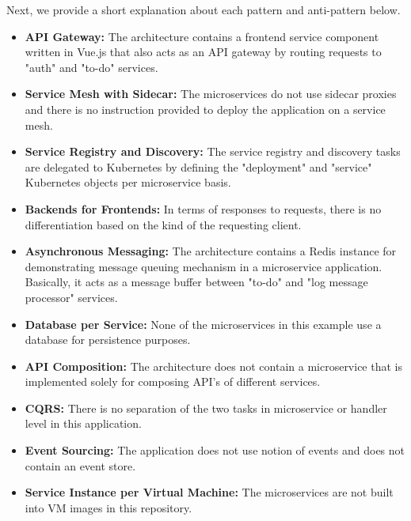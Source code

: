 \documentclass{Configuration_Files/PoliMi3i_thesis}
\begin{document}
Next, we provide a short explanation about each pattern and anti-pattern below.

\begin{itemize}
    \item \textbf{API Gateway:} The architecture contains a frontend service component written in Vue.js that also acts as an API gateway by routing requests to "auth" and "to-do" services.
    
    \item \textbf{Service Mesh with Sidecar:} The microservices do not use sidecar proxies and there is no instruction provided to deploy the application on a service mesh.
    
    \item \textbf{Service Registry and Discovery:} The service registry and discovery tasks are delegated to Kubernetes by defining the "deployment" and "service" Kubernetes objects per microservice basis.
    
    \item \textbf{Backends for Frontends:} In terms of responses to requests, there is no differentiation based on the kind of the requesting client.
    
    \item \textbf{Asynchronous Messaging:} The architecture contains a Redis instance for demonstrating message queuing mechanism in a microservice application.
    Basically, it acts as a message buffer between "to-do" and "log message processor" services.
    
    \item \textbf{Database per Service:} None of the microservices in this example use a database for persistence purposes.
    
    \item \textbf{API Composition:} The architecture does not contain a microservice that is implemented solely for composing API's of different services.
    
    \item \textbf{CQRS:} There is no separation of the two tasks in microservice or handler level in this application.
    
    \item \textbf{Event Sourcing:} The application does not use notion of events and does not contain an event store.
    
    \item \textbf{Service Instance per Virtual Machine:} The microservices are not built into VM images in this repository.
    

\end{itemize}
\end{document}
